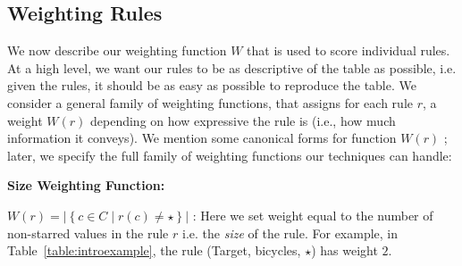 \documentclass[10pt,journal,compsoc]{IEEEtran}
\newcommand{\stitle}[1]{\vspace{0.5em}\noindent\textbf{#1}}
\newcommand{\papertext}[1]{}
\newcommand{\techreporttext}[1]{#1}
\begin{document}
\subsection{Weighting Rules}
\label{sec:weighting}
We now describe our weighting function $W$ that is used to score individual rules. 
At a high level, we want our rules to be as descriptive of the table as possible, i.e. given the rules, it should be as easy as possible to reproduce the table. We consider a general family of weighting functions, that assigns for each rule $r$, a weight $W(r)$ depending on how expressive the rule is (i.e., how much information
it conveys). We mention some canonical forms for function $W(r)$ \papertext{(their detailed interpretations are described in the technical report)}; later, we specify the full
family of weighting functions our techniques can handle:

\stitle{Size Weighting Function:} 

$W(r) = |\left\lbrace c \in C \mid r(c) \neq \star \right\rbrace |$ : 
Here we set weight equal to the number of non-starred values in the rule $r$ i.e. the {\em size} of the rule. For example, in Table~\ref{table:introexample}, the rule (Target, bicycles, $\star$) has weight $2$.
\end{document}
